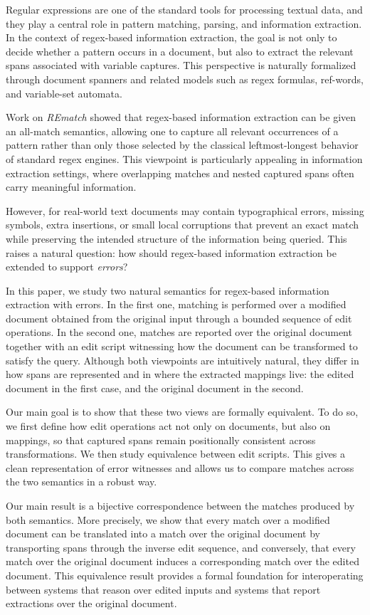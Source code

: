 
Regular expressions are one of the standard tools for processing textual data, and they play a central role in pattern matching, parsing, and information extraction. In the context of regex-based information extraction, the goal is not only to decide whether a pattern occurs in a document, but also to extract the relevant spans associated with variable captures. This perspective is naturally formalized through document spanners and related models such as regex formulas, ref-words, and variable-set automata.

Work on \emph{REmatch} showed that regex-based information extraction can be given an all-match semantics, allowing one to capture all relevant occurrences of a pattern rather than only those selected by the classical leftmost-longest behavior of standard regex engines. This viewpoint is particularly appealing in information extraction settings, where overlapping matches and nested captured spans often carry meaningful information.

However, for real-world text documents may contain typographical errors, missing symbols, extra insertions, or small local corruptions that prevent an exact match while preserving the intended structure of the information being queried. This raises a natural question: how should regex-based information extraction be extended to support \emph{errors}?

In this paper, we study two natural semantics for regex-based information extraction with errors. In the first one, matching is performed over a modified document obtained from the original input through a bounded sequence of edit operations. In the second one, matches are reported over the original document together with an edit script witnessing how the document can be transformed to satisfy the query. Although both viewpoints are intuitively natural, they differ in how spans are represented and in where the extracted mappings live: the edited document in the first case, and the original document in the second.

Our main goal is to show that these two views are formally equivalent. To do so, we first define how edit operations act not only on documents, but also on mappings, so that captured spans remain positionally consistent across transformations. We then study equivalence between edit scripts. This gives a clean representation of error witnesses and allows us to compare matches across the two semantics in a robust way.

Our main result is a bijective correspondence between the matches produced by both semantics. More precisely, we show that every match over a modified document can be translated into a match over the original document by transporting spans through the inverse edit sequence, and conversely, that every match over the original document induces a corresponding match over the edited document. This equivalence result provides a formal foundation for interoperating between systems that reason over edited inputs and systems that report extractions over the original document.
